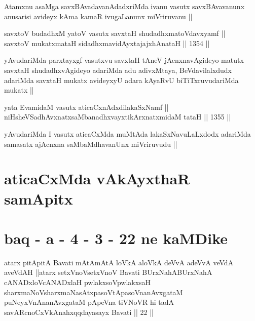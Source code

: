\begin{artha}
Atamxnu asaMga savxBAvadavanAdadxriMda ivanu vasutx savxBAvavanunx anusarisi avideyx kAma kamaR ivugaLanunx miVriruvanu ||
\end{artha}


\begin{shl}
savxtoV budadhxM yatoV vasutx savxtaH shudadhxmatoV\s davxyamf || \\
savxtoV mukatxmataH sidadhxmavidAyxtajajxhAnataH ||  1354 ||  
\end{shl}

\begin{artha}
yAvudariMda parxtayxgf vasutxvu savxtaH tAneV jAcnxnavAgideyo matutx savxtaH shudadhxvAgideyo adariMda adu adivxMtaya, BeVdavilalxdudx adariMda savxtaH mukatx avideyxyU adara kAyaRvU biTiTxruvudariMda mukatx ||
\end{artha}


\begin{shl}
yata EvamidaM vasutx aticaCxnAdxdilakaSxNamf || \\
niHsheVSadhAvxnatxsaMbanadhxvayxtikArxnatxmidaM tataH ||  1355 ||  
\end{shl}

\begin{artha}
yAvudariMda I vasutx aticaCxMda muMtAda lakaSxNavuLaLxdodx adariMda samasatx ajAcnxna saMbaMdhavanUnx miVriruvudu ||
\end{artha}

\section*{aticaCxMda vAkAyxthaR samApitx}

\section*{baq - a - 4 - 3 - 22 ne kaMDike}

\begin{shl}
atarx pitApitA Bavati mAtAmAtA loVkA aloVkA deVvA adeVvA veVdA aveVdAH ||atarx setxVnoV\s setxVnoV Bavati BUrxNahABUrxNahA cANADxloV\s cANADxlaH pwlakxsoV\s pwlakxsaH sharxmaNoV\s sharxmaNasAtxpasoV\s tApasoV\s nanAvxgataM puNeyxVnAnanAvxgataM pApeVna tiVNoVR hi tadA savARcnoCxVkAnahxqqdayasayx Bavati || 22 ||
\end{shl}

